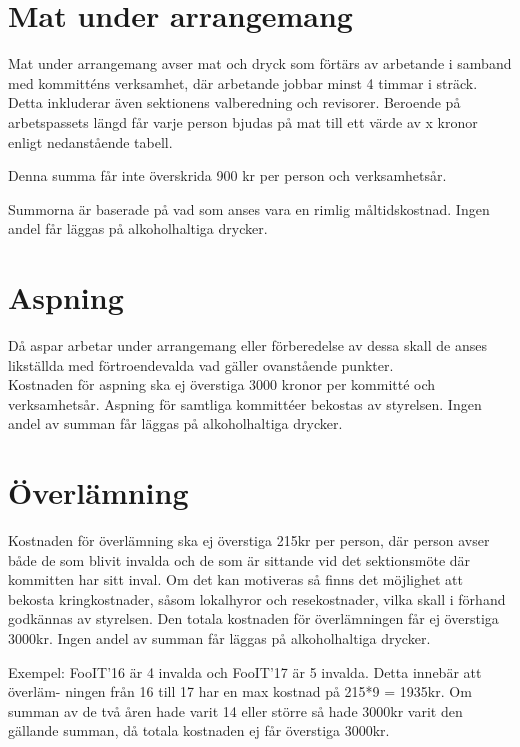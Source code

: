 \documentclass[11pt, includeaddress]{classes/cthit}
\begin{document}
\section{Mat under arrangemang}
Mat under arrangemang avser mat och dryck som förtärs av arbetande i samband med kommitténs verksamhet, där arbetande jobbar minst 4 timmar i sträck. Detta inkluderar även sektionens valberedning och revisorer. Beroende på arbetspassets längd får varje person bjudas på mat till ett värde av x kronor enligt nedanstående tabell.

\addvbuffer[\the\baselineskip]{\begin{tabular}{ l  c  c  c}
	\centering
	Timmar & [0-4] & (4-8] & (8-$\infty$) \\
	\hline
	Kronor & 0 & 45 & 90 \\
\end{tabular}}

    Denna summa får inte överskrida 900 kr per person och verksamhetsår.

    Summorna är baserade på vad som anses vara en rimlig
    måltidskostnad. Ingen andel får läggas på alkoholhaltiga drycker.

\section{Aspning}
Då aspar arbetar under arrangemang eller förberedelse av dessa skall de anses likställda med förtroendevalda vad gäller ovanstående punkter. \\

Kostnaden för aspning ska ej överstiga 3000 kronor per kommitté och verksamhetsår.
Aspning för samtliga kommittéer bekostas av styrelsen. Ingen andel av summan får läggas på alkoholhaltiga drycker.

\section{Överlämning}
Kostnaden för överlämning ska ej överstiga 215kr per person, där person avser både de som blivit invalda och de som är sittande vid det sektionsmöte där kommitten har sitt inval. Om det kan motiveras så finns det möjlighet att bekosta kringkostnader, såsom lokalhyror och resekostnader, vilka skall i förhand godkännas av styrelsen. Den totala kostnaden för överlämningen får ej överstiga 3000kr. Ingen andel av summan får läggas på alkoholhaltiga drycker.

Exempel: FooIT’16 är 4 invalda och FooIT’17 är 5 invalda. Detta innebär att överläm- ningen från 16 till 17 har en max kostnad på 215*9 = 1935kr. Om summan av de två åren hade varit 14 eller större så hade 3000kr varit den gällande summan, då totala kostnaden ej får överstiga 3000kr.
\end{document}

